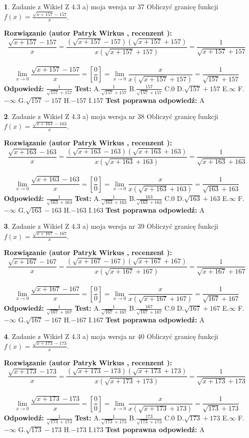 \documentclass[12pt, a4paper]{article}
\theoremstyle{definition} %
\newtheorem{zad}{}
\newcommand{\zadStart}[1]{\begin{zad}#1\newline}
\newcommand{\zadStop}{\end{zad}}
\newcommand{\rozwStart}[2]{\noindent \textbf{Rozwiązanie (autor #1 , recenzent #2): }\newline}
\newcommand{\rozwStop}{\newline}
\newcommand{\odpStart}{\noindent \textbf{Odpowiedź:}\newline}
\newcommand{\odpStop}{\newline}
\newcommand{\testStart}{\noindent \textbf{Test:}\newline}
\newcommand{\testStop}{\newline}
\newcommand{\kluczStart}{\noindent \textbf{Test poprawna odpowiedź:}\newline}
\newcommand{\kluczStop}{\newline}
\begin{document}
\zadStart{Zadanie z Wikieł Z 4.3 a) moja wersja nr 37}
Obliczyć granicę funkcji $f(x)=\frac{\sqrt{x+157}-157}{x}$.
\zadStop
\rozwStart{Patryk Wirkus}{}
$$\frac{\sqrt{x+157}-157}{x}=\frac{(\sqrt{x+157}-157)(\sqrt{x+157}+157)}{x(\sqrt{x+157}+157)}=\frac{1}{\sqrt{x+157}+157}$$
\\
$$\lim\limits_{x\to0}\frac{\sqrt{x+157}-157}{x}=[\frac{0}{0}]=
\lim\limits_{x\to0}\frac{x}{x(\sqrt{x+157}+157)} = \frac{1}{\sqrt{157}+157}$$
\rozwStop
\odpStart
$\frac{1}{\sqrt{157}+157}$
\odpStop
\testStart
A.$\frac{1}{\sqrt{157}+157}$
B.$\frac{157}{\sqrt{157}+157}$
C.$0$
D.$\sqrt{157}+157$
E.$\infty$
F.$-\infty$
G.$\sqrt{157}-157$
H.$-157$
I.$157$
\testStop
\kluczStart
A
\kluczStop



\zadStart{Zadanie z Wikieł Z 4.3 a) moja wersja nr 38}
Obliczyć granicę funkcji $f(x)=\frac{\sqrt{x+163}-163}{x}$.
\zadStop
\rozwStart{Patryk Wirkus}{}
$$\frac{\sqrt{x+163}-163}{x}=\frac{(\sqrt{x+163}-163)(\sqrt{x+163}+163)}{x(\sqrt{x+163}+163)}=\frac{1}{\sqrt{x+163}+163}$$
\\
$$\lim\limits_{x\to0}\frac{\sqrt{x+163}-163}{x}=[\frac{0}{0}]=
\lim\limits_{x\to0}\frac{x}{x(\sqrt{x+163}+163)} = \frac{1}{\sqrt{163}+163}$$
\rozwStop
\odpStart
$\frac{1}{\sqrt{163}+163}$
\odpStop
\testStart
A.$\frac{1}{\sqrt{163}+163}$
B.$\frac{163}{\sqrt{163}+163}$
C.$0$
D.$\sqrt{163}+163$
E.$\infty$
F.$-\infty$
G.$\sqrt{163}-163$
H.$-163$
I.$163$
\testStop
\kluczStart
A
\kluczStop



\zadStart{Zadanie z Wikieł Z 4.3 a) moja wersja nr 39}
Obliczyć granicę funkcji $f(x)=\frac{\sqrt{x+167}-167}{x}$.
\zadStop
\rozwStart{Patryk Wirkus}{}
$$\frac{\sqrt{x+167}-167}{x}=\frac{(\sqrt{x+167}-167)(\sqrt{x+167}+167)}{x(\sqrt{x+167}+167)}=\frac{1}{\sqrt{x+167}+167}$$
\\
$$\lim\limits_{x\to0}\frac{\sqrt{x+167}-167}{x}=[\frac{0}{0}]=
\lim\limits_{x\to0}\frac{x}{x(\sqrt{x+167}+167)} = \frac{1}{\sqrt{167}+167}$$
\rozwStop
\odpStart
$\frac{1}{\sqrt{167}+167}$
\odpStop
\testStart
A.$\frac{1}{\sqrt{167}+167}$
B.$\frac{167}{\sqrt{167}+167}$
C.$0$
D.$\sqrt{167}+167$
E.$\infty$
F.$-\infty$
G.$\sqrt{167}-167$
H.$-167$
I.$167$
\testStop
\kluczStart
A
\kluczStop



\zadStart{Zadanie z Wikieł Z 4.3 a) moja wersja nr 40}
Obliczyć granicę funkcji $f(x)=\frac{\sqrt{x+173}-173}{x}$.
\zadStop
\rozwStart{Patryk Wirkus}{}
$$\frac{\sqrt{x+173}-173}{x}=\frac{(\sqrt{x+173}-173)(\sqrt{x+173}+173)}{x(\sqrt{x+173}+173)}=\frac{1}{\sqrt{x+173}+173}$$
\\
$$\lim\limits_{x\to0}\frac{\sqrt{x+173}-173}{x}=[\frac{0}{0}]=
\lim\limits_{x\to0}\frac{x}{x(\sqrt{x+173}+173)} = \frac{1}{\sqrt{173}+173}$$
\rozwStop
\odpStart
$\frac{1}{\sqrt{173}+173}$
\odpStop
\testStart
A.$\frac{1}{\sqrt{173}+173}$
B.$\frac{173}{\sqrt{173}+173}$
C.$0$
D.$\sqrt{173}+173$
E.$\infty$
F.$-\infty$
G.$\sqrt{173}-173$
H.$-173$
I.$173$
\testStop
\kluczStart
A
\kluczStop
\end{document}
